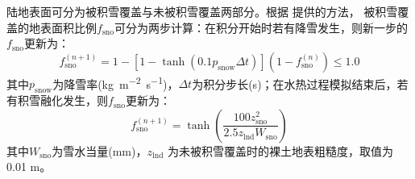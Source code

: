 陆地表面可分为被积雪覆盖与未被积雪覆盖两部分。根据 \citet{swenson2012new}提供的方法，
被积雪覆盖的地表面积比例$f_{\mathrm{sno}}$可分为两步计算：在积分开始时若有降雪发生，则新一步的$f_{\mathrm{sno}}$更新为：
\begin{equation}
  f_{\mathrm{{sno }}}^{(n+1)}=1-\left[1-\tanh\left(0.1 p_{\mathrm{snow}} \Delta t\right)\right]\left(1-f_{\mathrm{{sno }}}^{(n)}\right) \leqslant 1.0
\end{equation}
其中$p_{\mathrm {snow}}$为降雪率(\unit{kg.m^{-2}.s^{-1}})，$\Delta t$为积分步长(s)；在水热过程模拟结束后，若有积雪融化发生，则$f_{\mathrm{sno}}$更新为：
\begin{equation}
  f_{\mathrm{sno}}^{(n+1)}=\tanh{\left(\frac{100 z_{\mathrm{s n o}}^{2}}{2.5 z_{\mathrm{lnd}} W_{\mathrm{sno}}}\right)}
\end{equation}
其中$W_{\mathrm{sno}}$为雪水当量(mm)，$z_{\mathrm{lnd}}$ 为未被积雪覆盖时的裸土地表粗糙度，取值为0.01 m。

